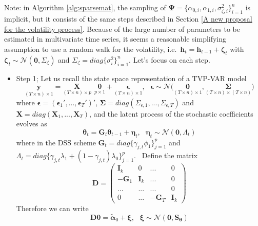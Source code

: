 \documentclass[
  12pt,
]{book}
\theoremstyle{break}
\theoremstyle{nonumberplain}
\begin{document}
Note: in Algorithm \ref{alg:sparsemat}, the sampling of
\(\boldsymbol{\Psi}=\{\alpha_{0,i},\alpha_{1,i},\sigma^{2}_{\zeta,i}\}_{i=1}^{n}\)
is implicit, but it consists of the same steps described in Section
\ref{A new proposal for the volatility process}. Because of the large
number of parameters to be estimated in multivariate time series, it
seems a reasonable simplifying assumption to use a random walk for the
volatility,
i.e.~\(\boldsymbol{h}_{t}=\boldsymbol{h}_{t-1}+\boldsymbol{\zeta}_{t}\)
with
\(\boldsymbol{\zeta}_{t}\sim\mathcal{N}(\boldsymbol{0},\Sigma_{\zeta})\)
and \(\Sigma_{\zeta}=diag\{\sigma^{2}_{i}\}_{i=1}^{n}\). Let's focus on
each step.

\begin{itemize}
\item Step 1; Let us recall the state space representation of a TVP-VAR model 
\[\underset{(T \times n)\times1}{\boldsymbol{y}}=\underset{(T\times n)\times p}{\boldsymbol{X}}\ \ \underset{p\times 1}{\boldsymbol{\theta}} + \underset{(T \times n)\times1}{\boldsymbol{\epsilon}}, \ \ \ \boldsymbol{\epsilon} \sim \mathcal{N}\bigg(\underset{(T \times n)\times1}{\boldsymbol{0}},\underset{(T \times n)\times (T\times n)}{\boldsymbol{\Sigma}}\bigg)\]
where $\boldsymbol{\epsilon} = (\boldsymbol{\epsilon}_{1}',...,\boldsymbol{\epsilon}_{T}')'$, $\boldsymbol{\Sigma} = diag(\Sigma_{\epsilon,1},...,\Sigma_{\epsilon,T})$ and $\boldsymbol{X} = diag(\boldsymbol{X}_{1},...,\boldsymbol{X}_{T})$, and the latent process of the stochastic coefficients evolves as 
\[\boldsymbol{\theta}_{t}=\boldsymbol{G}_{t}\boldsymbol{\theta}_{t-1}+\boldsymbol{\eta}_{t}, \ \ \ \boldsymbol{\eta}_{t} \sim \mathcal{N}(\boldsymbol{0},\Lambda_{t})\]
where in the DSS scheme $\boldsymbol{G}_{t}=diag\{\gamma_{j,t}\phi_{1}\}_{j=1}^{p}$ and $\Lambda_{t}=diag\{\gamma_{j,t}\lambda_{1}+(1-\gamma_{j,t})\lambda_{0}\}_{j=1}^{p}$. \
Define the matrix 
\begin{equation} \label{eq:D}
\boldsymbol{D} = \begin{pmatrix}
\boldsymbol{I}_{k} & 0 & ... & 0\\
-\boldsymbol{G}_{1} & \boldsymbol{I}_{k} & ... & 0\\
... & ... & ... & 0 \\
0 & ... & -\boldsymbol{G}_{T} & \boldsymbol{I}_{k}
\end{pmatrix}
\end{equation}
Therefore we can write
\[  \boldsymbol{D}\boldsymbol{\theta} = \boldsymbol{\tilde{\alpha}}_{0}+\boldsymbol{\xi}, \ \ \ \boldsymbol{\xi} \sim \mathcal{N}(\boldsymbol{0},\boldsymbol{S_\theta}) \]

\end{itemize}
\end{document}
